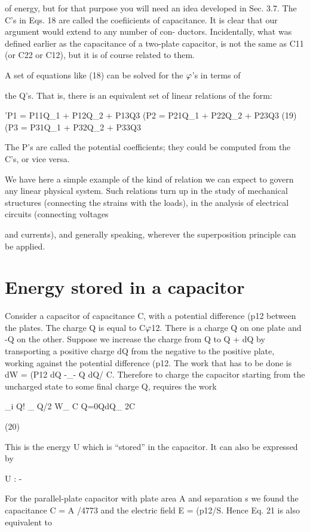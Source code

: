 of energy, but for that purpose you will need an idea developed in
Sec. 3.7. The C's in Eqs. 18 are called the coefiicients of capacitance.
It is clear that our argument would extend to any number of con-
ductors. Incidentally, what was defined earlier as the capacitance
of a two-plate capacitor, is not the same as C11 (or C22 or C12), but
it is of course related to them.

A set of equations like (18) can be solved for the $\varphi$'s in terms of

the Q's. That is, there is an equivalent set of linear relations of the
form:

'P1 = P11Q_1 + P12Q_2 + P13Q3
(P2 = P21Q_1 + P22Q_2 + P23Q3 (19)
(P3 = P31Q_1 + P32Q_2 + P33Q3

The P's are called the potential coefficients; they could be computed
from the C's, or vice versa.

We have here a simple example of the kind of relation we can
expect to govern any linear physical system. Such relations turn up
in the study of mechanical structures (connecting the strains with
the loads), in the analysis of electrical circuits (connecting voltages

and currents), and generally speaking, wherever the superposition
principle can be applied.

\section{Energy stored in a capacitor}

Consider a capacitor of capacitance C, with a potential difference
(p12 between the plates. The charge Q is equal to C$\varphi$12. There is a
charge Q on one plate and -Q on the other. Suppose we increase
the charge from Q to Q + dQ by transporting a positive charge dQ
from the negative to the positive plate, working against the potential
difference (p12. The work that has to be done is dW = (P12 dQ -_-
Q dQ/ C. Therefore to charge the capacitor starting from the uncharged
state to some final charge Q, requires the work

_i Q! _ Q/2
W_ C Q=0QdQ_ 2C

(20)

This is the energy U which is ``stored'' in the capacitor. It can also
be expressed by

U : -%

For the parallel-plate capacitor with plate area A and separation s
we found the capacitance C = A /4773 and the electric field E = (p12/S.
Hence Eq. 21 is also equivalent to


